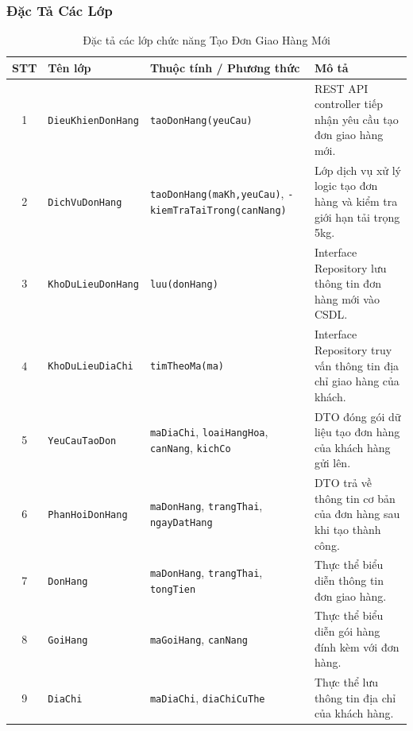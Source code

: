 \subsubsection{Đặc Tả Các Lớp}
\begin{table}[H]
  \centering
  \small
  \begin{tabularx}{\textwidth}{|c|>{\raggedright\arraybackslash}p{3.5cm}|>{\raggedright\arraybackslash}p{4.5cm}|>{\raggedright\arraybackslash}X|}
    \hline
    \textbf{STT} & \textbf{Tên lớp} & \textbf{Thuộc tính / Phương thức} & \textbf{Mô tả} \\
    \hline
    1 & \texttt{Dieu\allowbreak Khien\allowbreak Don\allowbreak Hang} & \texttt{tao\allowbreak Don\allowbreak Hang\allowbreak (yeu\allowbreak Cau)} & REST API controller tiếp nhận yêu cầu tạo đơn giao hàng mới. \\ \hline
    2 & \texttt{Dich\allowbreak Vu\allowbreak Don\allowbreak Hang} & \texttt{tao\allowbreak Don\allowbreak Hang\allowbreak (ma\allowbreak Kh,\allowbreak yeu\allowbreak Cau)}, \texttt{- kiem\allowbreak Tra\allowbreak Tai\allowbreak Trong\allowbreak (can\allowbreak Nang)} & Lớp dịch vụ xử lý logic tạo đơn hàng và kiểm tra giới hạn tải trọng 5kg. \\ \hline
    3 & \texttt{Kho\allowbreak Du\allowbreak Lieu\allowbreak Don\allowbreak Hang} & \texttt{luu\allowbreak (don\allowbreak Hang)} & Interface Repository lưu thông tin đơn hàng mới vào CSDL. \\ \hline
    4 & \texttt{Kho\allowbreak Du\allowbreak Lieu\allowbreak Dia\allowbreak Chi} & \texttt{tim\allowbreak Theo\allowbreak Ma\allowbreak (ma)} & Interface Repository truy vấn thông tin địa chỉ giao hàng của khách. \\ \hline
    5 & \texttt{Yeu\allowbreak Cau\allowbreak Tao\allowbreak Don} & \texttt{ma\allowbreak Dia\allowbreak Chi}, \texttt{loai\allowbreak Hang\allowbreak Hoa}, \texttt{can\allowbreak Nang}, \texttt{kich\allowbreak Co} & DTO đóng gói dữ liệu tạo đơn hàng của khách hàng gửi lên. \\ \hline
    6 & \texttt{Phan\allowbreak Hoi\allowbreak Don\allowbreak Hang} & \texttt{ma\allowbreak Don\allowbreak Hang}, \texttt{trang\allowbreak Thai}, \texttt{ngay\allowbreak Dat\allowbreak Hang} & DTO trả về thông tin cơ bản của đơn hàng sau khi tạo thành công. \\ \hline
    7 & \texttt{Don\allowbreak Hang} & \texttt{ma\allowbreak Don\allowbreak Hang}, \texttt{trang\allowbreak Thai}, \texttt{tong\allowbreak Tien} & Thực thể biểu diễn thông tin đơn giao hàng. \\ \hline
    8 & \texttt{Goi\allowbreak Hang} & \texttt{ma\allowbreak Goi\allowbreak Hang}, \texttt{can\allowbreak Nang} & Thực thể biểu diễn gói hàng đính kèm với đơn hàng. \\ \hline
    9 & \texttt{Dia\allowbreak Chi} & \texttt{ma\allowbreak Dia\allowbreak Chi}, \texttt{dia\allowbreak Chi\allowbreak Cu\allowbreak The} & Thực thể lưu thông tin địa chỉ của khách hàng. \\
    \hline
  \end{tabularx}
  \caption{Đặc tả các lớp chức năng Tạo Đơn Giao Hàng Mới}
  \label{tab:class-spec-uc02}
\end{table}

